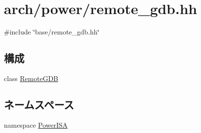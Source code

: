 \hypertarget{arch_2power_2remote__gdb_8hh}{
\section{arch/power/remote\_\-gdb.hh}
\label{arch_2power_2remote__gdb_8hh}
}
{\ttfamily \#include \char`\"{}base/remote\_\-gdb.hh\char`\"{}}\par
\subsection*{構成}
\begin{DoxyCompactItemize}
\item 
class \hyperlink{classPowerISA_1_1RemoteGDB}{RemoteGDB}
\end{DoxyCompactItemize}
\subsection*{ネームスペース}
\begin{DoxyCompactItemize}
\item 
namespace \hyperlink{namespacePowerISA}{PowerISA}
\end{DoxyCompactItemize}
